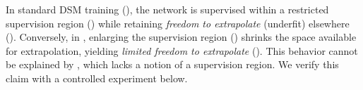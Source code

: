 In standard DSM training (), the network is supervised within a restricted supervision region () while retaining \emph{freedom to extrapolate} (underfit) elsewhere (). Conversely, in , enlarging the supervision region () shrinks the space available for extrapolation, yielding \emph{limited freedom to extrapolate} (). This behavior cannot be explained by \common, which lacks a notion of a supervision region. We verify this claim with a controlled experiment below.

\newcommand{\trainr}{\xblue{\train_\text{region}}}
\newcommand{\trainrp}{\train_\text{region}}
\newcommand{\trainrabs}{\xblue{|\train_\text{region}|}}
\newcommand{\trainrabsp}{|\train_\text{region}|}
\newcommand{\trains}{\xxgreen{\train_\text{score}}}
\newcommand{\trainsp}{\train_\text{score}}
\newcommand{\trainsabs}{\xxgreen{|\train_\text{score}|}}
\newcommand{\trainsabsp}{|\train_\text{score}|}
\newcommand{\trainabs}{|\train|}



